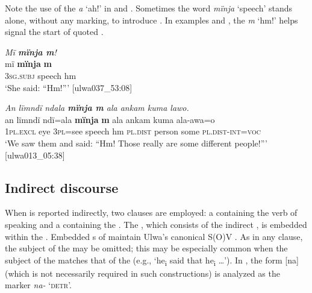 
Note the use of the  \textit{a} ‘ah!’ in  and . Sometimes the word \textit{mïnja} ‘speech’ stands alone, without any  marking, to introduce . In examples  and , the  \textit{m} ‘hm!’ helps signal the start of quoted .


\ea%
    \label{ex:syntax:230}
          \textit{Mï \textbf{mïnja m}!}\\
\gll    mï      \textbf{mïnja}  \textbf{m}\\
    3\textsc{sg.subj}  speech  hm\\
\glt `She said: “Hm!”’ [ulwa037\_53:08]
\z

\ea%
    \label{ex:syntax:231}
          \textit{An lïmndï ndala \textbf{mïnja m} ala ankam kuma lawo.}\\
\gll    an      lïmndï  ndï=ala  \textbf{mïnja}  \textbf{m}  ala      ankam  kuma     ala{}-awa{}=o\\
    1\textsc{pl.excl}  eye    3\textsc{pl}=see  speech  hm  \textsc{pl.dist}  person  some    \textsc{pl.dist-int=voc}\\
\glt `We saw them and said: “Hm! Those really are some different people!”’ [ulwa013\_05:38]
\z

\subsection{Indirect discourse}\label{sec:13.4.5}


When  is reported indirectly, two clauses are employed: a  containing the verb of speaking and a  containing the . The , which consists of the indirect , is embedded within the . Embedded s of  maintain Ulwa’s canonical S(O)V . As in any clause, the subject of the  may be omitted; this may be especially common when the subject of the  matches that of the  (e.g., ‘he\textsubscript{i} said that he\textsubscript{i} …’). In , the form [na] (which is not necessarily required in such constructions) is analyzed as the  marker \textit{na-} ‘\textsc{detr}’.

